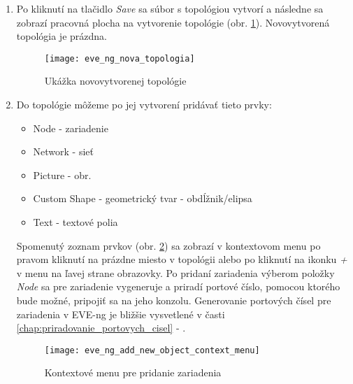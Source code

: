 \begin{enumerate}[noitemsep]
    \item Po kliknutí na tlačidlo \emph{Save} sa súbor s topológiou vytvorí a následne sa zobrazí pracovná plocha na vytvorenie topológie (obr. \ref{obr:eve_ng_nova_topologia}). Novovytvorená topológia  je prázdna.

\begin{figure}
    \centering
    \texttt{[image: eve\_ng\_nova\_topologia]}
    \caption{Ukážka novovytvorenej topológie}
    \label{obr:eve_ng_nova_topologia}
\end{figure}

    \item Do topológie môžeme po jej vytvorení pridávať tieto prvky:
    
    \begin{itemize}[noitemsep]
        \item Node - zariadenie
        \item Network - sieť
        \item Picture - obr.
        \item Custom Shape - geometrický tvar - obdĺžnik/elipsa
        \item Text - textové polia
    \end{itemize}
    
    Spomenutý zoznam prvkov (obr. \ref{obr:eve_ng_add_new_object_context_menu}) sa zobrazí v kontextovom menu po pravom kliknutí na prázdne miesto v topológii alebo po kliknutí na ikonku \emph{+} v menu na ľavej strane obrazovky. Po pridaní zariadenia výberom položky \emph{Node} sa pre zariadenie vygeneruje a priradí portové číslo, pomocou ktorého bude možné, pripojiť sa na jeho konzolu. Generovanie portových čísel pre zariadenia v EVE-ng je bližšie vysvetlené v časti \ref{chap:priradovanie_portovych_cisel} - .

\begin{figure}
    \centering
    \texttt{[image: eve\_ng\_add\_new\_object\_context\_menu]}
    \caption{Kontextové menu pre pridanie zariadenia}
    \label{obr:eve_ng_add_new_object_context_menu}
\end{figure}
    

\end{enumerate}
